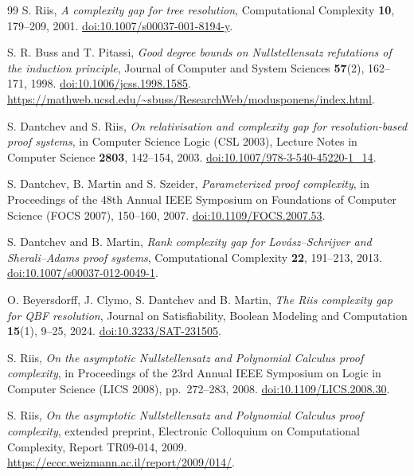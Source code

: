 \clearpage
\begin{thebibliography}{99}
\small
\setlength{\itemsep}{0pt}\setlength{\parsep}{0pt}
S. Riis, \emph{A complexity gap for tree resolution},
Computational Complexity \textbf{10}, 179--209, 2001.
\href{https://doi.org/10.1007/s00037-001-8194-y}{doi:10.1007/s00037-001-8194-y}.

S. R. Buss and T. Pitassi, \emph{Good degree bounds on Nullstellensatz
refutations of the induction principle}, Journal of Computer and System
Sciences \textbf{57}(2), 162--171, 1998.
\href{https://doi.org/10.1006/jcss.1998.1585}{doi:10.1006/jcss.1998.1585}.
\url{https://mathweb.ucsd.edu/~sbuss/ResearchWeb/modusponens/index.html}.

S. Dantchev and S. Riis, \emph{On relativisation and complexity gap for
resolution-based proof systems}, in Computer Science Logic (CSL 2003),
Lecture Notes in Computer Science \textbf{2803}, 142--154, 2003.
\href{https://doi.org/10.1007/978-3-540-45220-1_14}{doi:10.1007/978-3-540-45220-1\_14}.

S. Dantchev, B. Martin and S. Szeider, \emph{Parameterized proof complexity},
in Proceedings of the 48th Annual IEEE Symposium on Foundations of Computer Science
(FOCS 2007), 150--160, 2007.
\href{https://doi.org/10.1109/FOCS.2007.53}{doi:10.1109/FOCS.2007.53}.

S. Dantchev and B. Martin, \emph{Rank complexity gap for Lov\'asz--Schrijver
and Sherali--Adams proof systems}, Computational Complexity \textbf{22},
191--213, 2013.
\href{https://doi.org/10.1007/s00037-012-0049-1}{doi:10.1007/s00037-012-0049-1}.

O. Beyersdorff, J. Clymo, S. Dantchev and B. Martin, \emph{The Riis complexity
gap for QBF resolution}, Journal on Satisfiability, Boolean Modeling and
Computation \textbf{15}(1), 9--25, 2024.
\href{https://doi.org/10.3233/SAT-231505}{doi:10.3233/SAT-231505}.

S. Riis, \emph{On the asymptotic Nullstellensatz and Polynomial Calculus proof complexity}, in
Proceedings of the 23rd Annual IEEE Symposium on Logic in Computer Science
(LICS 2008), pp.~272--283, 2008.
\href{https://doi.org/10.1109/LICS.2008.30}{doi:10.1109/LICS.2008.30}.

S. Riis, \emph{On the asymptotic Nullstellensatz and Polynomial Calculus proof complexity}, extended preprint,
Electronic Colloquium on Computational Complexity, Report TR09-014, 2009.
\url{https://eccc.weizmann.ac.il/report/2009/014/}.


\end{thebibliography}
